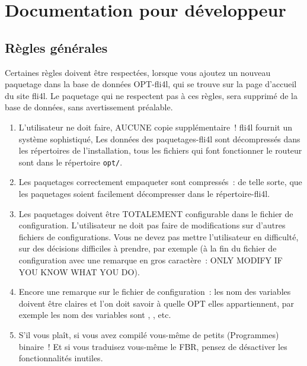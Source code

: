 \chapter{Documentation pour développeur}

\section{Règles générales}

Certaines règles doivent être respectées, lorsque vous ajoutez un nouveau
paquetage dans la base de données OPT-fli4l, qui se trouve sur la page
d'accueil du site fli4l. Le paquetage qui ne respectent pas à ces règles,
sera supprimé de la base de données, sans avertissement préalable.

  \begin{enumerate}
    \item L'utilisateur ne doit faire, AUCUNE copie supplémentaire~! fli4l
    fournit un système sophistiqué, Les données des paquetages-fli4l sont
    décompressés dans les répertoires de l'installation, tous les fichiers
	qui font fonctionner le routeur sont dans le répertoire \texttt{opt/}.

    \item Les paquetages correctement empaqueter sont compressés~: de telle sorte,
    que les paquetages soient facilement décompresser dans le répertoire-fli4l.

    \item Les paquetages doivent être TOTALEMENT configurable dans le fichier de
    configuration. L'utilisateur ne doit pas faire de modifications sur
    d'autres fichiers de configurations. Vous ne devez pas mettre l'utilisateur
    en difficulté, sur des décisions difficiles à prendre, par exemple
    (à la fin du fichier de configuration avec une remarque en gros caractère~:
    ONLY MODIFY IF YOU KNOW WHAT YOU DO).

    \item Encore une remarque sur le fichier de configuration~: les nom des
    variables doivent être claires et l'on doit savoir à quelle OPT elles
    appartiennent, par exemple  les nom des variables sont
    , , etc.

    \item S'il vous plaît, si vous avez compilé vous-même de petits (Programmes)
    binaire~! Et si vous traduisez vous-même le FBR, pensez de désactiver les
	fonctionnalités inutiles.


\end{enumerate}
